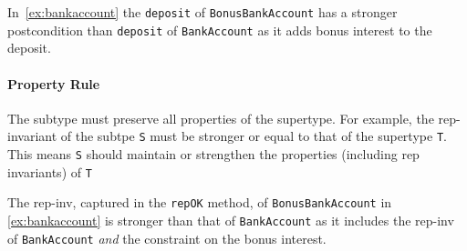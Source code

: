 \documentclass[oneside,11pt,dvipsnames]{book}
\newcommand{\code}[1]{\texttt{#1}}
\begin{document}
In~\autoref{ex:bankaccount} the \code{deposit} of \code{BonusBankAccount} has a stronger postcondition than \code{deposit} of \code{BankAccount} as it adds bonus interest to the deposit.

\paragraph{Property Rule} The subtype must preserve all properties of the supertype.  For example, the rep-invariant of the subtpe \code{S} must be stronger or equal to that of the supertype \code{T}. This means \code{S} should maintain or strengthen the properties (including rep invariants) of \code{T}


The rep-inv, captured in the \code{repOK} method, of \code{BonusBankAccount} in \autoref{ex:bankaccount} is stronger than that of \code{BankAccount} as it includes the rep-inv of \code{BankAccount} \emph{and} the constraint on the bonus interest.
\end{document}
